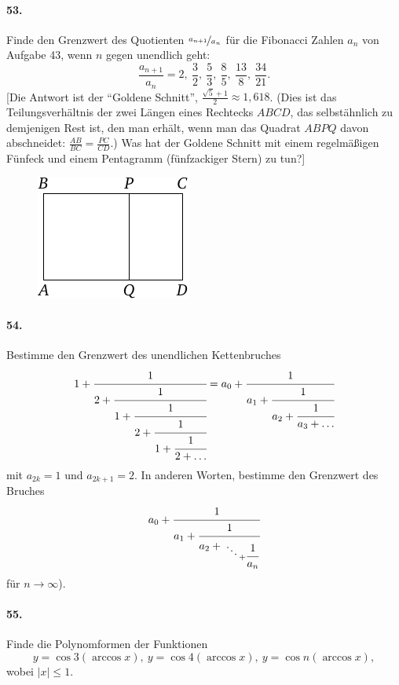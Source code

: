 \documentclass[10pt,a5paper,twoside]{article}
\newenvironment{problem}[1]{\paragraph*{#1}}{}
\begin{document}
\begin{problem}{53.}
	Finde den Grenzwert des Quotienten $\nicefrac{a_{n+1}}{a_n}$ für die Fibonacci Zahlen $a_n$ von Aufgabe 43, wenn $n$ gegen unendlich geht:
	\begin{equation*}
	\frac{a_{n+1}}{a_n}=2,\ \frac 32,\ \frac53, \ \frac85, \ \frac{13}8,
	\ \frac{34}{21}.
	\end{equation*}
	[Die Antwort ist der \enquote{Goldene Schnitt},
	$\frac{\sqrt{5}+1}{2} \approx 1{,}618$. (Dies ist das Tei\-lungs\-ver\-hält\-nis der zwei Längen eines Rechtecks $ABCD$, das selbstähnlich zu demjenigen Rest ist, den man erhält, wenn man das Quadrat $ABPQ$ davon abschneidet: 
	$\frac{AB}{BC}=\frac{PC}{CD}$.) Was hat der Goldene Schnitt mit einem regelmäßigen Fünfeck und einem Pentagramm (fünfzackiger Stern) zu tun?]
	\begin{figure}[H]
	\centering
	\includegraphics{taskbook-37}
	\end{figure}
\end{problem}

\begin{problem}{54.}
	Bestimme den Grenzwert des unendlichen Kettenbruches
	\begin{equation*}
	1+\cfrac{1}{2+\cfrac{1}{1+\cfrac{1}{2+\cfrac{1}{1+\cfrac{1}{2+\ldots}}}}}=
	a_0+\cfrac{1}{a_1+\cfrac{1}{a_2+\cfrac{1}{a_3+\dots}}}
	\end{equation*}
	mit $a_{2k}=1$ und $a_{2k+1}=2$. In anderen Worten, bestimme den Grenzwert des Bruches
	\begin{equation*}
	a_0+\cfrac{1}{a_1+\cfrac{1}{a_2+{\atop{\ddots \atop {}} + \cfrac{1}{a_n}}}}
	\end{equation*}
	für $n \to \infty$).
\end{problem}

\begin{problem}{55.}
	Finde die Polynomformen der Funktionen 
	\begin{equation*}
	y=\cos 3 (\arccos x),\ y=\cos 4 (\arccos x),\ 
	y=\cos n (\arccos x),
	\end{equation*}
	wobei $|x| \leqslant 1$.
\end{problem}
\end{document}
